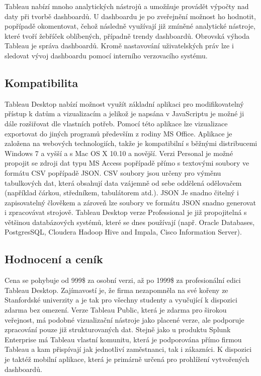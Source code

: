 \documentclass[czech,BP]{thesiskiv}
\begin{document}
 
 Tableau nabízí mnoho analytických nástrojů a umožňuje provádět výpočty nad daty při tvorbě dashboardů. U dashboardu je po zveřejnění možnost ho hodnotit, popřípadě okomentovat, čehož následně využívají již zmíněné analytické nástroje, které tvoří žebříček oblíbených, případně trendy dashboardů. Obrovská výhoda Tableau je správa dashboardů. Kromě nastavování uživatelských práv lze i sledovat vývoj dashboardu pomocí interního verzovacího systému.\cite{TableauVersion}
  
 \subsection{Kompatibilita}
 Tableau Desktop nabízí možnost využít základní aplikaci pro modifikovatelný přístup k datům a vizualizacím a jelikož je napsána v JavaScriptu je možné ji dále rozšiřovat dle vlastních potřeb. Pomocí této aplikace lze vizualizace exportovat do jiných programů především z rodiny MS Office. Aplikace je založena na webových technologiích, takže je kompatibilní s běžnými distribucemi Windows 7 a vyšší a s Mac OS X 10.10 a novější. Verzi Personal je možné propojit se zdroji dat typu MS Access popřípadě přímo s textovými soubory ve formátu CSV popřípadě JSON. CSV soubory jsou určeny pro výměnu tabulkových dat, která obsahují data vzájemně od sebe oddělená odělovačem (například čárkou, středníkem, tabulátorem atd.). JSON \cite{JSON} Je snadno čitelný i zapisovatelný člověkem a zároveň lze soubory ve formátu JSON snadno generovat i zpracovávat strojově. Tableau Desktop verze Professional je již propojitelná s většinou databázových systémů, které se dnes používají (např. Oracle Databases, PostgresSQL, Cloudera Hadoop Hive and Impala, Cisco Information Server).\cite{TableauSources}
 
 \subsection{Hodnocení a ceník}
 Cena se pohybuje od 999\$ za osobní verzi, až po 1999\$ za profesionální edici Tableau Desktop.\cite{TableauPricing} Zajímavostí je, že firma nezapomněla na své kořeny ze Stanfordské univerzity a je tak pro všechny studenty a vyučující k dispozici zdarma bez omezení. Verze Tableau Public, která je zdarma pro širokou veřejnost, má podobné vizualizační nástroje jako placené verze, ale podporuje zpracování pouze již strukturovaných dat. Stejně jako u produktu Splunk Enterprise má Tableau vlastní komunitu, která je podporována přímo firmou Tableau a kam přispívají jak jednotliví zaměstnanci, tak i zákazníci. K dispozici je taktéž mobilní aplikace, která je primárně určená pro prohlížení vytvořených dashboardů. 
 
\end{document}

